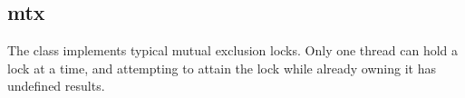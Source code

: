 %
%
%
%
%

\subsection{mtx}
\label{mtx}

The  class implements typical mutual exclusion locks.  Only one
thread can hold a lock at a time, and attempting to attain the lock while
already owning it has undefined results.

